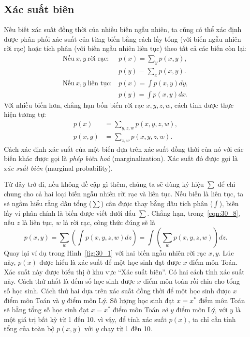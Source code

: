 \subsection{Xác suất biên}
Nếu biết xác suất đồng thời của nhiều biến ngẫu nhiên, ta cũng có thể xác định
được phân phối xác suất của từng biến bằng cách lấy tổng (với biến ngẫu nhiên rời
rạc) hoặc tích phân (với biến ngẫu nhiên liên tục) theo tất cả các biến còn lại:%
\begin{align}
\label{eqn:30_3}
\text{Nếu} ~x, y ~\text{rời rạc:}~ &p(x) = \sum_{y}p(x, y), \\
\label{eqn:30_4}
&p(y) = \sum_{x}p(x, y). \\
\label{eqn:30_5}
\text{Nếu} ~x, y ~\text{liên tục:}~ &p(x) = \int p(x, y)dy, \\
\label{eqn:30_6}
&p(y) = \int p(x, y)dx.
\end{align}
Với nhiều biến hơn, chẳng hạn bốn biến rời rạc $x, y, z, w$, cách tính được thực
hiện tương tự:
\begin{align}
\label{eqn:30_7}
p(x) &= \sum \limits_{ y, z, w}p(x, y, z, w),\\
\label{eqn:30_8}
p(x, y) &= \sum \limits_{z, w}p(x, y, z, w).
\end{align}
Cách xác định xác suất của một biến dựa trên xác suất đồng thời của nó với các
biến khác được gọi là \textit{phép biên hoá} (marginalization). Xác suất đó được gọi là
\textit{xác suất biên} (marginal probability).


Từ đây trở đi, nếu không đề cập gì thêm, chúng ta sẽ dùng ký hiệu $\sum$ để chỉ
chung cho cả hai loại biến ngẫu nhiên rời rạc và liên tục. Nếu biến là liên tục,
ta sẽ ngầm hiểu rằng dấu tổng ($\sum$) cần được thay bằng dấu tích phân
($\int$), biến lấy vi phân chính là biến được viết dưới dấu $\sum$. Chẳng hạn,
trong~\eqref{eqn:30_8}, nếu $z$ là liên tục, $w$ là rời rạc, công thức đúng sẽ
là
\begin{equation}
p(x, y) = \sum_{w}\left( \int p(x, y, z, w)dz \right) = \int \left( \sum_{w} p(x, y, z, w)\right) dz.
\end{equation}
Quay lại ví dụ trong Hình~\ref{fig:30_1} với hai biến ngẫu nhiên rời rạc $x, y$.
Lúc này, $p(x)$ được hiểu là xác suất để một học sinh đạt được $x$ điểm môn
Toán. Xác suất này được biểu thị ở khu vực ``Xác suất biên''. Có hai cách tính
xác suất này. Cách thứ nhất là đếm số học sinh được $x$ điểm môn toán rồi chia
cho tổng số học sinh. Cách thứ hai dựa trên xác suất đồng thời để một học sinh
được $x$ điểm môn Toán và $y$ điểm môn Lý. Số lượng học sinh đạt $x = x^*$ điểm
môn Toán sẽ bằng tổng số học sinh đạt $x = x^*$ điểm môn Toán \textit{và} $y$
điểm môn Lý, với $y$ là một giá trị bất kỳ từ 1 đến 10. vì vậy, để tính xác suất
$p(x)$, ta chỉ cần tính tổng của toàn bộ $p(x, y)$ với $y$ chạy từ 1 đến 10.

